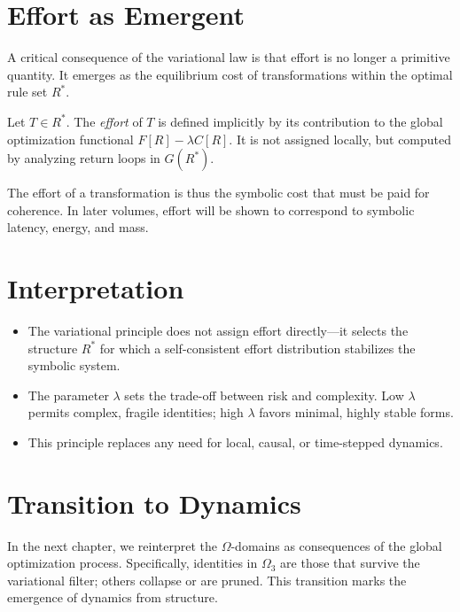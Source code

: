 \section{Effort as Emergent}

A critical consequence of the variational law is that effort is no longer a primitive quantity. It emerges as the equilibrium cost of transformations within the optimal rule set $R^*$.

\begin{definition}[Effort]
Let $T \in R^*$. The \emph{effort} of $T$ is defined implicitly by its contribution to the global optimization functional $F[R] - \lambda C[R]$. It is not assigned locally, but computed by analyzing return loops in $G(R^*)$.
\end{definition}

\noindent
The effort of a transformation is thus the symbolic cost that must be paid for coherence. In later volumes, effort will be shown to correspond to symbolic latency, energy, and mass.

\section{Interpretation}

\begin{itemize}
    \item The variational principle does not assign effort directly—it selects the structure $R^*$ for which a self-consistent effort distribution stabilizes the symbolic system.
    \item The parameter $\lambda$ sets the trade-off between risk and complexity. Low $\lambda$ permits complex, fragile identities; high $\lambda$ favors minimal, highly stable forms.
    \item This principle replaces any need for local, causal, or time-stepped dynamics.
\end{itemize}

\section{Transition to Dynamics}

In the next chapter, we reinterpret the $\Omega$-domains as consequences of the global optimization process. Specifically, identities in $\Omega_3$ are those that survive the variational filter; others collapse or are pruned. This transition marks the emergence of dynamics from structure.

